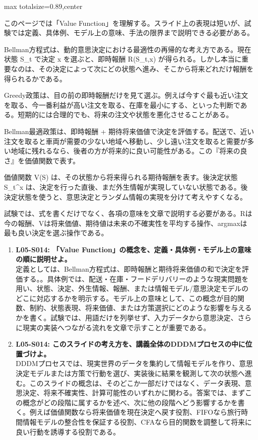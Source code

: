 \begin{minipage}[t]{0.58\textwidth}
\begin{adjustbox}{max totalsize={\textwidth}{0.89\textheight},center}
\begin{minipage}{\textwidth}\scriptsize
{}このページでは「Value Function」を理解する。スライド上の表現は短いが、試験では定義、具体例、モデル上の意味、手法の限界まで説明できる必要がある。\par
Bellman方程式は、動的意思決定における最適性の再帰的な考え方である。現在状態 S\_t で決定 x を選ぶと、即時報酬 R(S\_t,x) が得られる。しかし本当に重要なのは、その決定によって次にどの状態へ進み、そこから将来どれだけ報酬を得られるかである。\par
Greedy政策は、目の前の即時報酬だけを見て選ぶ。例えば今すぐ最も近い注文を取る、今一番利益が高い注文を取る、在庫を最小にする、といった判断である。短期的には合理的でも、将来の注文や状態を悪化させることがある。\par
Bellman最適政策は、即時報酬 + 期待将来価値で決定を評価する。配送で、近い注文を取ると車両が需要の少ない地域へ移動し、少し遠い注文を取ると需要が多い地域に残れるなら、後者の方が将来的に良い可能性がある。この『将来の良さ』を価値関数で表す。\par
価値関数 V(S) は、その状態から将来得られる期待報酬を表す。後決定状態 S\_t\textasciicircum{}x は、決定を行った直後、まだ外生情報が実現していない状態である。後決定状態を使うと、意思決定とランダム情報の実現を分けて考えやすくなる。\par
試験では、式を書くだけでなく、各項の意味を文章で説明する必要がある。Rは今の報酬、Vは将来価値、期待値は未来の不確実性を平均する操作、argmaxは最も良い決定を選ぶ操作である。\par{}\begin{enumerate}\item \textbf{L05-S014: 「Value Function」の概念を、定義・具体例・モデル上の意味の順に説明せよ。}\\定義としては、Bellman方程式は、即時報酬と期待将来価値の和で決定を評価する。。具体例では、配送・在庫・フードデリバリーのような現実問題を用い、状態、決定、外生情報、報酬、または情報モデル/意思決定モデルのどこに対応するかを明示する。モデル上の意味として、この概念が目的関数、制約、状態表現、将来価値、または方策選択にどのような影響を与えるかを書く。試験では、用語だけを列挙せず、入力データから意思決定、さらに現実の実装へつながる流れを文章で示すことが重要である。\item \textbf{L05-S014: このスライドの考え方を、講義全体のDDDMプロセスの中に位置づけよ。}\\DDDMプロセスでは、現実世界のデータを集約して情報モデルを作り、意思決定モデルまたは方策で行動を選び、実装後に結果を観測して次の状態へ進む。このスライドの概念は、そのどこか一部だけではなく、データ表現、意思決定、将来不確実性、計算可能性のいずれかに関わる。答案では、まずこの概念がどの段階に属するかを述べ、次に他の段階へどう影響するかを書く。例えば価値関数なら将来価値を現在決定へ戻す役割、FIFOなら旅行時間情報モデルの整合性を保証する役割、CFAなら目的関数を調整して将来に良い行動を誘導する役割である。\end{enumerate}

\end{minipage}
\end{adjustbox}
\end{minipage}
